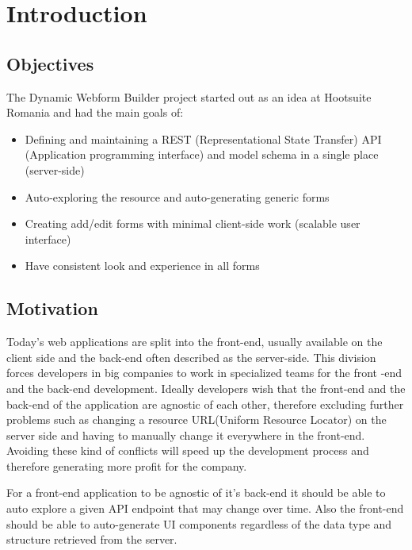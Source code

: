 \chapter{Introduction}
\label{chapter:intro}

\section{Objectives}
\label{sec:objectives}

The Dynamic Webform Builder project started out as an idea at Hootsuite Romania and had the main goals of:
\begin{itemize}
	
	\item Defining and maintaining a REST (Representational State Transfer) API (Application programming interface) and model schema in a single place (server-side)
	
	\item Auto-exploring the resource and auto-generating generic forms
	
	\item Creating add/edit forms with minimal client-side work (scalable user interface)
	
	\item Have consistent look and experience in all forms
	
\end{itemize}

\section{Motivation}
\label{sec:motivation}

Today's web applications are split into the front-end, usually available on the client side and the back-end often described as the server-side. This division forces developers in big companies to work in specialized teams for the front -end and the back-end development. Ideally developers wish that the front-end and the back-end of the application are agnostic of each other, therefore excluding further problems such as changing a resource URL(Uniform Resource Locator) on the server side and having to manually change it everywhere in the front-end. Avoiding these kind of conflicts will speed up the development process and therefore generating more profit for the company.

For a front-end application to be agnostic of it's back-end it should be able to auto explore a given API endpoint that may change over time. Also the front-end should be able to auto-generate UI components regardless of the data type and structure retrieved from the server.

